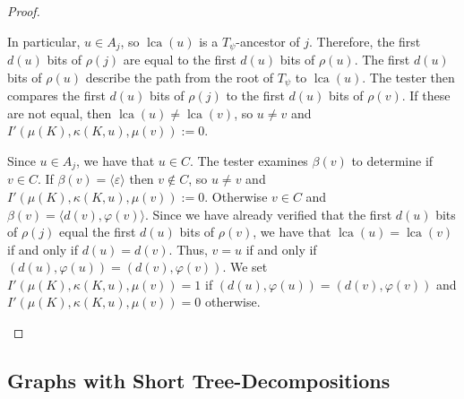 \documentclass{patmorin}
\DeclareMathOperator{\lca}{lca}
\begin{document}
\begin{proof}
\begin{itemize}
          In particular, $u\in A_j$, so $\lca(u)$ is a $T_\psi$-ancestor of $j$.   Therefore, the first $d(u)$ bits of $\rho(j)$ are equal to the first $d(u)$ bits of $\rho(u)$.  The first $d(u)$ bits of $\rho(u)$ describe the path from the root of $T_\psi$ to $\lca(u)$.  The tester then compares the first $d(u)$ bits of $\rho(j)$ to the first $d(u)$ bits of $\rho(v)$.  If these are not equal,  then $\lca(u)\neq\lca(v)$, so $u\neq v$ and $I'(\mu(K),\kappa(K,u),\mu(v)):=0$.

          Since $u\in A_j$, we have that $u\in C$.  The tester examines $\beta(v)$ to determine if $v\in C$.  If $\beta(v)=\langle\varepsilon\rangle$ then $v\not\in C$, so $u\neq v$ and $I'(\mu(K),\kappa(K,u),\mu(v)):=0$. Otherwise $v\in C$ and $\beta(v)=\langle d(v),\varphi(v)\rangle$. Since we have already verified that the first $d(u)$ bits of $\rho(j)$ equal the first $d(u)$ bits of $\rho(v)$, we have that $\lca(u)=\lca(v)$ if and only if $d(u)=d(v)$. Thus, $v=u$ if and only if $(d(u),\varphi(u))=(d(v),\varphi(v))$.
          We set $I'(\mu(K),\kappa(K,u),\mu(v))=1$ if $(d(u),\varphi(u))=(d(v),\varphi(v))$ and $I'(\mu(K),\kappa(K,u),\mu(v))=0$ otherwise.\qedhere
  \end{itemize}
\end{proof}

\subsection{Graphs with Short Tree-Decompositions}
\label{sec:short}
\end{document}
